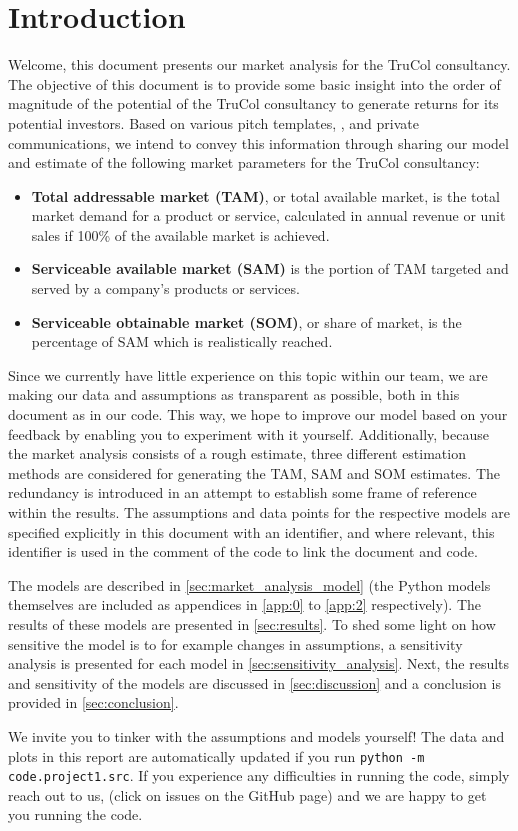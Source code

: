 \section{Introduction}\label{sec:intro}
Welcome, this document presents our market analysis for the TruCol consultancy. The objective of this document is to provide some basic insight into the order of magnitude of the potential of the TruCol consultancy to generate returns for its potential investors. Based on various pitch templates, \cite{kamps2020}, and private communications, we intend to convey this information through sharing our model and estimate of the following market parameters for the TruCol consultancy:

\begin{itemize}
	\item \textbf{Total addressable market (TAM)}, or total available market, is the total market demand for a product or service, calculated in annual revenue or unit sales if 100\% of the available market is achieved\cite{tam_sam_som}.
	\item \textbf{Serviceable available market (SAM)} is the portion of TAM targeted and served by a company's products or services\cite{tam_sam_som}.
	\item \textbf{Serviceable obtainable market (SOM)}, or share of market, is the percentage of SAM which is realistically reached\cite{tam_sam_som}.
\end{itemize}


\noindent Since we currently have little experience on this topic within our team, we are making our data and assumptions as transparent as possible, both in this document as in our code. This way, we hope to improve our model based on your feedback by enabling you to experiment with it yourself. Additionally, because the market analysis consists of a rough estimate, three different estimation methods are considered for generating the TAM, SAM and SOM estimates. The redundancy is introduced in an attempt to establish some frame of reference within the results. %
The assumptions and data points for the respective models are specified explicitly in this document with an identifier, and where relevant, this identifier is used in the comment of the code to link the document and code. 

The models are described in \cref{sec:market_analysis_model} (the Python models themselves are included as appendices in \cref{app:0} to \cref{app:2} respectively). The results of these models are presented in \cref{sec:results}. To shed some light on how sensitive the model is to for example changes in assumptions, a sensitivity analysis is presented for each model in \cref{sec:sensitivity_analysis}. Next, the results and sensitivity of the models are discussed in \cref{sec:discussion} and a conclusion is provided in \cref{sec:conclusion}.

We invite you to tinker with the assumptions and models yourself! The data and plots in this report are automatically updated if you run \verb+python -m code.project1.src+. If you experience any difficulties in running the code, simply reach out to us, (click on issues on the GitHub page) and we are happy to get you running the code.

